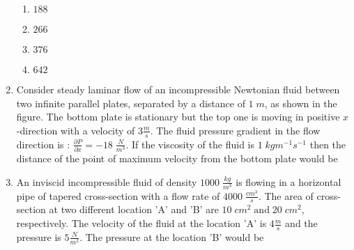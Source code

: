 \documentclass[journal,12pt,onecolumn]{IEEEtran}
\theoremstyle{remark}
\begin{document}
\begin{enumerate}[start=27]
\begin{figure}[!ht]
\label{fig:my_label}
\end{figure}
\begin{enumerate}
    \item $188$
    \item $266$
    \item $376$
    \item $642$
\end{enumerate}
\item Consider steady laminar flow of an incompressible Newtonian fluid between two infinite parallel plates, separated by a distance of $1\;m$, as shown in the figure. The bottom plate is stationary but the top one is moving in positive $x$-direction with a velocity of $3\frac{m}{s}$. The fluid pressure gradient in the flow direction is : $\frac{\partial P}{\partial x}=-18\;\frac{N}{m^3}$. If the viscosity of the fluid is $1\;kgm^{-1}s^{-1}$ then the distance of the point of maximum velocity  from the bottom plate would be \underline{\hspace{2cm}}
\begin{figure}[H]
\centering
{}
\end{figure}
\item An inviscid incompressible fluid of density $1000\;\frac{kg}{m^3}$ is flowing in a horizontal pipe of tapered cross-section with a flow rate of $4000\;\frac{cm^3}{s}$. The area of cross-section at two different location 'A' and 'B' are $10\;cm^2 \;\text{and} \;20\;cm^2$, respectively. The velocity of the fluid at the location 'A' is $4\frac{m}{s}$ and the pressure is $5\frac{N}{m^2}$. The pressure  at the location 'B' would be \underline{\hspace{2cm}}

\end{enumerate}
\end{document}
